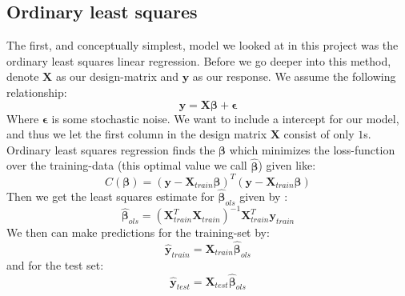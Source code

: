 \documentclass{article}
\begin{document}
\subsection{Ordinary least squares}
The first, and conceptually simplest, model we looked at in this project was the
ordinary least squares linear regression. Before we go deeper into this
method, denote $\mathbf{X}$ as our design-matrix and $\mathbf{y}$ as our
response. We assume the following relationship:
$$\mathbf{y} = \mathbf{X} \bm{\beta} + \bm{\epsilon}$$
Where $\bm{\epsilon}$ is some stochastic noise.
We want to include a intercept for our model, and thus we let the first column
in the design matrix $\mathbf{X}$ consist of only $1$s. Ordinary least squares
regression finds the $\bm{\beta}$ which minimizes the loss-function over the
training-data (this optimal value we call $\hat{\bm{\beta}}$) given like:
$$C(\bm{\beta}) = (\mathbf{y} - \mathbf{X}_{train} \bm{\beta})^T (\mathbf{y} - \mathbf{X}_{train} \bm{\beta})$$
Then we get the least squares estimate for $\hat{\bm{\beta}}_{ols}$ given by \cite[s.~3.2]{hastie2009elements}:
$$\hat{\bm{\beta}}_{ols} = (\mathbf{X}^T_{train} \mathbf{X}_{train})^{-1} \mathbf{X}^T_{train} \mathbf{y}_{train}$$
We then can make predictions for the training-set by:
$$\hat{\mathbf{y}}_{train} = \mathbf{X}_{train} \hat{\bm{\beta}}_{ols}$$
and for the test set:
$$\hat{\mathbf{y}}_{test} = \mathbf{X}_{test} \hat{\bm{\beta}}_{ols}$$
\end{document}
